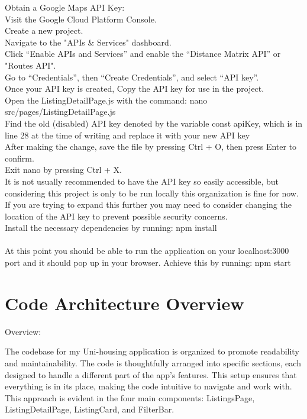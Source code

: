 \documentclass[10pt,twocolumn]{article}
\begin{document}
Obtain a Google Maps API Key:\\
Visit the Google Cloud Platform Console.\\
Create a new project.\\
Navigate to the "APIs \& Services" dashboard.\\
Click “Enable APIs and Services” and enable the “Distance Matrix API” or "Routes API".\\
Go to “Credentials”, then “Create Credentials”, and select “API key”. \\
Once your API key is created, Copy the API key for use in the project. \\
Open the ListingDetailPage.js with the command: nano src/pages/ListingDetailPage.js\\
Find the old (disabled) API key denoted by the variable const apiKey, which is in line 28 at the time of writing and replace it with your new API key\\
After making the change, save the file by pressing Ctrl + O, then press Enter to confirm.\\
Exit nano by pressing Ctrl + X.\\
It is not usually recommended to have the API key so easily accessible, but considering this project is only to be run locally this organization is fine for now. If you are trying to expand this further you may need to consider changing the location of the API key to prevent possible security concerns. \\

Install the necessary dependencies by running: npm install\\
\\
At this point you should be able to run the application on your localhost:3000 port and it should pop up in your browser. Achieve this by running: npm start 




\section{Code Architecture Overview}
Overview:

The codebase for my Uni-housing application is organized to promote readability and maintainability. The code is thoughtfully arranged into specific sections, each designed to handle a different part of the app's features. This setup ensures that everything is in its place, making the code intuitive to navigate and work with. This approach is evident in the four main components: ListingsPage, ListingDetailPage, ListingCard, and FilterBar.
\end{document}
